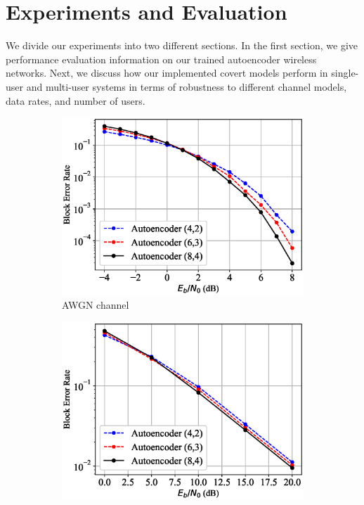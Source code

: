 \section{Experiments and Evaluation}
\label{s:eval}
We divide our experiments into two different sections. In the first section, we give performance evaluation information on our trained autoencoder wireless networks. Next, we discuss how our implemented covert models perform in single-user and multi-user systems in terms of robustness to different channel models, data rates, and number of users.

\begin{figure}[!tp]
	\center
	\begin{subfigure}{0.28\textwidth}
		\includegraphics[width=\linewidth]{figs/autoencoder_bler_awgn}
		\caption{AWGN channel}
	\end{subfigure}
	\begin{subfigure}{0.28\textwidth}
		\includegraphics[width=\linewidth]{figs/autoencoder_bler_rayleigh}

\end{subfigure}
\end{figure}
